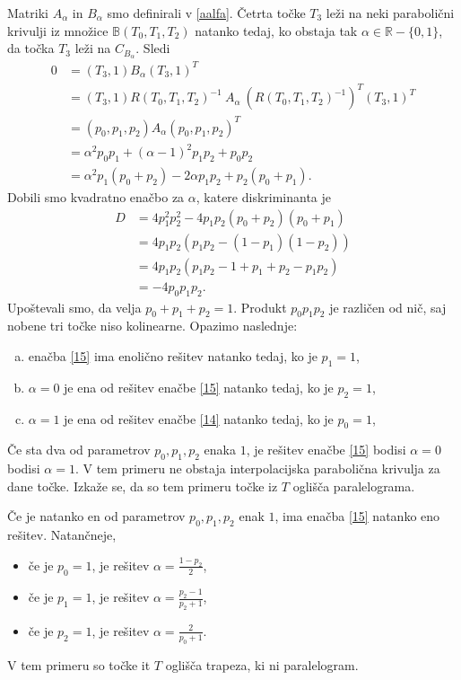 \documentclass[mat1]{fmfdelo}
\newcommand{\R}{\mathbb R}
\newcommand{\B}{\mathbb B}
\newcommand{\al}{\alpha}
\begin{document}
\begin{dokaz}
Matriki $A_\al$ in $B_\al$ smo definirali v \ref{aalfa}. Četrta točke $T_3$ leži na neki parabolični krivulji iz množice  $\B(T_0, T_1, T_2)$ natanko tedaj, ko obstaja tak $\al \in \R - \{0,1 \}$, da točka $T_3$ leži na $C_{B_\al}$. Sledi
\begin{align}
0	&= (T_3, 1) B_\al (T_3, 1)^T \nonumber \\
	&= (T_3, 1) R(T_0, T_1, T_2)^{-1}\  A_{\al} \  (R(T_0, T_1, T_2)^{-1})^T (T_3, 1)^T \nonumber \\
	&= (p_0, p_1, p_2) A_\al (p_0, p_1, p_2)^T \nonumber \\
	&= \al^2 p_0 p_1 + (\al - 1)^2 p_1 p_2 + p_0 p_2 \label{14} \\ %
	&= \al^2 p_1(p_0 + p_2) - 2 \al p_1 p_2 + p_2(p_0 + p_1). \label{15}
\end{align}
Dobili smo kvadratno enačbo za $\al$, katere diskriminanta je 
\begin{align*}
D	&= 4 p_1^2 p_2^2 - 4 p_1 p_2(p_0 + p_2)(p_0 + p_1)  \\
	&= 4 p_1 p_2(p_1 p_2 - (1 - p_1)(1 - p_2))  \\
	&= 4 p_1 p_2(p_1 p_2 - 1 + p_1 + p_2 - p_1 p_2)  \\
	&= - 4 p_0 p_1 p_2. 
\end{align*}
Upoštevali smo, da velja $ p_0 + p_1 + p_2 = 1$. Produkt $p_0 p_1 p_2$ je različen od nič, saj nobene tri točke niso kolinearne. Opazimo naslednje:
\begin{enumerate}[a)]
\item enačba \eqref{15} ima enolično rešitev natanko tedaj, ko je $p_1 = 1$,
\item $\al = 0$ je ena od rešitev enačbe \eqref{15} natanko tedaj, ko je $p_2 = 1$, %
\item $\al = 1$ je ena od rešitev enačbe \eqref{14} natanko tedaj, ko je $p_0 = 1$, %
\end{enumerate}

Če sta dva od parametrov $p_0, p_1, p_2$ enaka $1$, je rešitev enačbe \eqref{15} bodisi $\al = 0$ bodisi $\al = 1$. V tem primeru ne obstaja interpolacijska parabolična krivulja za dane točke. Izkaže se, da so tem primeru točke iz $T$ oglišča paralelograma.

Če je natanko en od parametrov $p_0, p_1, p_2$ enak $1$, ima enačba \eqref{15} natanko eno rešitev. Natančneje, 
\begin{itemize}
\item če je $p_0 = 1$, je rešitev $\al = \frac{1 - p_2}{2}$,
\item če je $p_1 = 1$, je rešitev $\al = \frac{p_2 - 1}{p_2 + 1}$,
\item če je $p_2 = 1$, je rešitev $\al = \frac{2}{p_0 + 1}$.
\end{itemize}
V tem primeru so točke it $T$ oglišča trapeza, ki ni paralelogram.


\end{dokaz}
\end{document}
